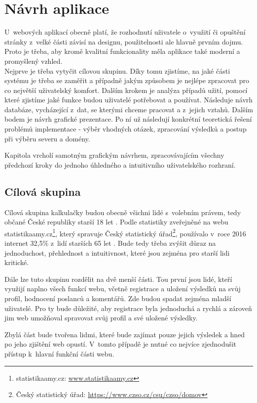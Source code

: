 \chapter{Návrh aplikace}
\label{chap:navrh}
U~webových aplikací obecně platí, že rozhodnutí uživatele o~využití či opuštění stránky z~velké části závisí na designu, použitelnosti ale hlavně prvním dojmu. Proto je třeba, aby kromě kvalitní funkcionality měla aplikace také moderní a promyšlený vzhled. \\
Nejprve je třeba vytyčit cílovou skupinu. Díky tomu zjistíme, na jaké části systému je třeba se zaměřit a případně jakým způsobem je nejlépe zpracovat pro co největší uživatelský komfort. Dalším krokem je analýza případů užití, pomocí které zjistíme jaké funkce budou uživatelé potřebovat a používat. Následuje návrh databáze, vycházející z~dat, se kterými chceme pracovat a z~jejich vztahů. Dalším bodem je návrh grafické prezentace. Po ní už následují konkrétní teoretická řešení problémů implementace - výběr vhodných otázek, zpracování výsledků a postup při výběru severu a domény.

Kapitola vrcholí samotným grafickým návrhem, zpracovávajícím všechny předchozí kroky do jednoho úhledného a intuitivního uživatelského rozhraní.


\section{Cílová skupina}
Cílová skupina kalkulačky budou obecně všichni lidé s~volebním právem, tedy občané České republiky starší 18 let \cite{ustava-volebni_pravo}. Podle statistiky zveřejněné na webu statistikaamy.cz\footnote{statistikaamy.cz: \url{www.statistikaamy.cz}}, který spravuje Český statistický úřad\footnote{Český statistický úřad: \url{https://www.czso.cz/csu/czso/domov}}, používalo v~roce 2016 internet 32,5\% z~lidí starších 65 let \cite{statistikaamy}. Bude tedy třeba zvýšit důraz na jednoduchost, přehlednost a intuitivnost, které jsou zejména pro starší lidi kritické.
\par Dále lze tuto skupinu rozdělit na dvě menší části. Tou první jsou lidé, kteří využijí naplno všech funkcí webu, včetně registrace a uložení výsledků na svůj profil, hodnocení poslanců a komentářů. Zde budou spadat zejména mladší uživatelé. Pro ty bude důležité, aby registrace byla jednoduchá a rychlá a zároveň jim web umožňoval spravovat svůj profil a své uložené výsledky. 
\par Zbylá část bude tvořena lidmi, které bude zajímat pouze jejich výsledek a hned po jeho zjištění web opustí. V~tomto případě je nutné co nejvíce zjednodušit přístup k~hlavní funkční části webu.


